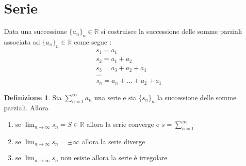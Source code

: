 \documentclass{article}
\theoremstyle{definition}
\newtheorem*{definizione}{Definizione}
\newcommand{\R}{\mathbb{R}}
\begin{document}
\section{Serie}
Data una successione $\{a_n \}_n \in \R$ si costruisce la successione delle somme parziali associata ad $\{a_n \}_n \in \R$ come segue :
\begin{align*}
	&s_1=a_1\\
	&s_2=a_1+a_2\\
	&s_3=a_3+a_2+a_1\\
	&\dots\\
	&s_n=a_n+\dots+a_2+a_1
\end{align*}
\begin{definizione}
	Sia $\sum_{n=1}^{\infty}a_n $ una serie e sia $\{s_n \}_n $ la successione delle somme parziali. Allora 
	\begin{enumerate}
		\item se $\lim_{n\rightarrow \infty} s_n=S \in \R$ allora la serie converge e $s=\sum_{n=1}^{\infty} $
		\item se $\lim_{n\rightarrow \infty} s_n=\pm \infty  $ allora la serie diverge
		\item se $\lim_{n\rightarrow \infty} s_n  $ non esiste  allora la serie è irregolare 
	\end{enumerate}
	\end{definizione}
\end{document}
